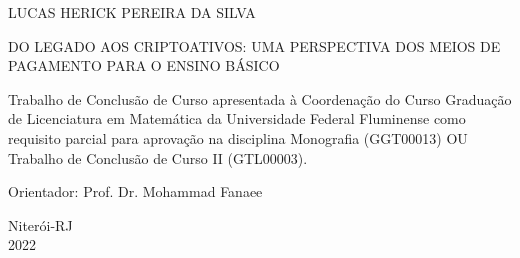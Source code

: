 
\setcounter{page}{1}

\begin{center}
	
	LUCAS HERICK PEREIRA DA SILVA	
	
	\vfill
	
\uppercase{Do legado aos criptoativos: uma perspectiva dos meios de pagamento para o ensino básico} 
	\vspace{3.0cm}
	
	\begin{flushright}
		\begin{minipage}{7.75 cm} %
			\nohyphens{
			Trabalho de Conclusão de Curso apresentada à Coordenação do Curso Graduação de Licenciatura em Matemática da Universidade Federal Fluminense como requisito parcial para aprovação na disciplina Monografia (GGT00013) OU Trabalho de Conclusão de Curso II (GTL00003).
		}
			
			
		\end{minipage}
	\end{flushright}
	
	\vspace{3.0cm}
	
	Orientador: Prof. Dr. Mohammad Fanaee
	
	\vfill
	
	Niterói-RJ\\2022
	
\end{center}
